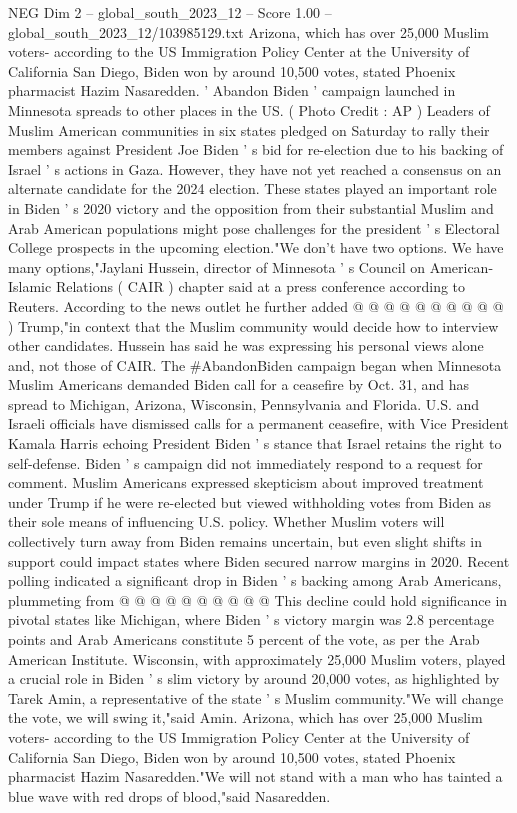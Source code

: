 \begin{textsample}{NEG Dim 2 – global\_south\_2023\_12 – Score 1.00 – global\_south\_2023\_12/103985129.txt}  \label{ex:f2_neg_419}
Arizona, which has over 25,000 Muslim voters- according to the US Immigration Policy Center at the University of California San Diego, Biden won by around 10,500 votes, stated Phoenix pharmacist Hazim Nasaredden. ' Abandon Biden ' campaign launched in Minnesota spreads to other places in the US. ( Photo Credit : AP ) Leaders of Muslim American communities in six states pledged on Saturday to rally their members against President Joe Biden ' s bid for re-election due to his backing of Israel ' s actions in Gaza.
However, they have not yet reached a consensus on an alternate candidate for the 2024 election.
These states played an important role in Biden ' s 2020 victory and the opposition from their substantial Muslim and Arab American populations might pose challenges for the president ' s Electoral College prospects in the upcoming election."We don't have two options.
We have many options,"Jaylani Hussein, director of Minnesota ' s Council on American-Islamic Relations ( CAIR ) chapter said at a press conference according to Reuters.
According to the news outlet he further added @ @ @ @ @ @ @ @ @ @ ) Trump,"in context that the Muslim community would decide how to interview other candidates.
Hussein has said he was expressing his personal views alone and, not those of CAIR.
The \#AbandonBiden campaign began when Minnesota Muslim Americans demanded Biden call for a ceasefire by Oct. 31, and has spread to Michigan, Arizona, Wisconsin, Pennsylvania and Florida.
U.S. and Israeli officials have dismissed calls for a permanent ceasefire, with Vice President Kamala Harris echoing President Biden ' s stance that Israel retains the right to self-defense.
Biden ' s campaign did not immediately respond to a request for comment.
Muslim Americans expressed skepticism about improved treatment under Trump if he were re-elected but viewed withholding votes from Biden as their sole means of influencing U.S. policy.
Whether Muslim voters will collectively turn away from Biden remains uncertain, but even slight shifts in support could impact states where Biden secured narrow margins in 2020.
Recent polling indicated a significant drop in Biden ' s backing among Arab Americans, plummeting from @ @ @ @ @ @ @ @ @ @ This decline could hold significance in pivotal states like Michigan, where Biden ' s victory margin was 2.8 percentage points and Arab Americans constitute 5 percent of the vote, as per the Arab American Institute.
Wisconsin, with approximately 25,000 Muslim voters, played a crucial role in Biden ' s slim victory by around 20,000 votes, as highlighted by Tarek Amin, a representative of the state ' s Muslim community."We will change the vote, we will swing it,"said Amin.
Arizona, which has over 25,000 Muslim voters- according to the US Immigration Policy Center at the University of California San Diego, Biden won by around 10,500 votes, stated Phoenix pharmacist Hazim Nasaredden."We will not stand with a man who has tainted a blue wave with red drops of blood,"said Nasaredden.

\end{textsample}
